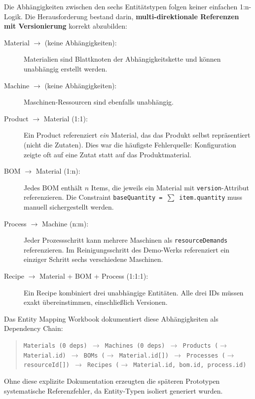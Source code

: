 Die Abhängigkeiten zwischen den sechs Entitätstypen folgen keiner einfachen 1:n-Logik. Die Herausforderung bestand darin, \textbf{multi-direktionale Referenzen mit Versionierung} korrekt abzubilden:

\begin{description}
    \item[Material $\rightarrow$ (keine Abhängigkeiten):] Materialien sind Blattknoten der Abhängigkeitskette und können unabhängig erstellt werden.

    \item[Machine $\rightarrow$ (keine Abhängigkeiten):] Maschinen-Ressourcen sind ebenfalls unabhängig.

    \item[Product $\rightarrow$ Material (1:1):] Ein Product referenziert \textit{ein} Material, das das Produkt selbst repräsentiert (nicht die Zutaten). Dies war die häufigste Fehlerquelle: Konfiguration zeigte oft auf eine Zutat statt auf das Produktmaterial.

    \item[BOM $\rightarrow$ Material (1:n):] Jedes BOM enthält $n$ Items, die jeweils ein Material mit \texttt{version}-Attribut referenzieren. Die Constraint \texttt{baseQuantity = $\sum$ item.quantity} muss manuell sichergestellt werden.

    \item[Process $\rightarrow$ Machine (n:m):] Jeder Prozessschritt kann mehrere Maschinen als \texttt{resourceDemands} referenzieren. Im Reinigungsschritt des Demo-Werks referenziert ein einziger Schritt sechs verschiedene Maschinen.

    \item[Recipe $\rightarrow$ Material + BOM + Process (1:1:1):] Ein Recipe kombiniert drei unabhängige Entitäten. Alle drei IDs müssen exakt übereinstimmen, einschließlich Versionen.
\end{description}

Das Entity Mapping Workbook dokumentiert diese Abhängigkeiten als Dependency Chain:

\begin{quote}
\small
\texttt{Materials (0 deps) $\rightarrow$ Machines (0 deps) $\rightarrow$ Products ($\rightarrow$ Material.id) $\rightarrow$ BOMs ($\rightarrow$ Material.id[]) $\rightarrow$ Processes ($\rightarrow$ resourceId[]) $\rightarrow$ Recipes ($\rightarrow$ Material.id, bom.id, process.id)}
\end{quote}

Ohne diese explizite Dokumentation erzeugten die späteren Prototypen systematische Referenzfehler, da Entity-Typen isoliert generiert wurden.

